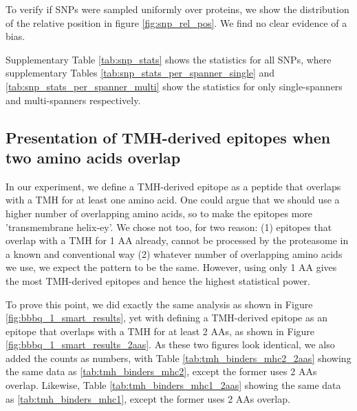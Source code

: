 
To verify if SNPs were sampled uniformly
over proteins, we show the distribution 
of the relative position in figure \ref{fig:snp_rel_pos}.
We find no clear evidence of a bias.


Supplementary Table \ref{tab:snp_stats} shows the statistics for all
SNPs, where supplementary Tables \ref{tab:snp_stats_per_spanner_single}
and \ref{tab:snp_stats_per_spanner_multi} show the
statistics for only single-spanners and multi-spanners respectively.
 






\clearpage

\subsection{Presentation of TMH-derived epitopes when two amino acids overlap}

In our experiment, we define a TMH-derived epitope as a peptide that overlaps
with a TMH for at least one amino acid. One could argue that we should use
a higher number of overlapping amino acids, so to make the epitopes more
'transmembrane helix-ey'. We chose not too, for two reason: (1) epitopes that overlap with a TMH
for 1 AA already, cannot be processed by the proteasome in a known and conventional
way (2) whatever number of overlapping amino acids we use, we expect the pattern to be the same.
However, using only 1 AA gives the most TMH-derived epitopes and hence the highest statistical
power.

To prove this point, we did exactly the same analysis 
as shown in Figure \ref{fig:bbbq_1_smart_results},
yet with defining a TMH-derived epitope as an epitope that overlaps with a TMH
for at least 2 AAs, as shown in Figure \ref{fig:bbbq_1_smart_results_2aas}.
As these two figures look identical, 
we also added the counts as numbers,
with Table \ref{tab:tmh_binders_mhc2_2aas} showing the same data
as \ref{tab:tmh_binders_mhc2}, except the former uses 2 AAs overlap.
Likewise, Table \ref{tab:tmh_binders_mhc1_2aas} showing the same data
as \ref{tab:tmh_binders_mhc1}, except the former uses 2 AAs overlap.

